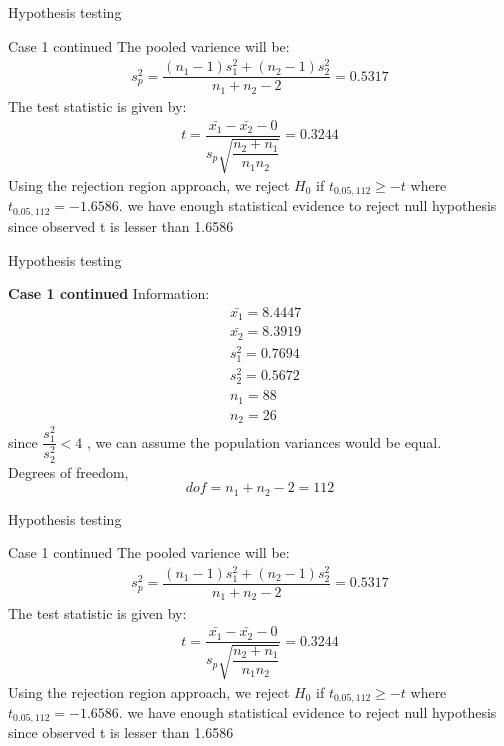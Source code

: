 \documentclass{beamer}
\begin{document}
    \begin{frame}{Hypothesis testing}
    \begin{block}{Case 1 continued}
        The pooled varience will be:
           \begin{align}
               s^2_p=\dfrac{(n_1-1)s^2_1+(n_2-1)s^2_2}{n_1+n_2-2}=0.5317
           \end{align}
           The test statistic is given by:
           \begin{align}
               t=\dfrac{\bar{x_1}-\bar{x_2}-0}{s_p\sqrt{\dfrac{n_2+n_1}{n_1n_2}}}=0.3244
           \end{align}
           Using the rejection region approach, we reject $H_0$ if $t_{0.05,112}\geq -t$ where $t_{0.05,112}=-1.6586$. we have enough statistical evidence to reject null hypothesis since observed t is lesser than 1.6586
           
    \end{block}
        
    \end{frame}

        \begin{frame}{Hypothesis testing}
        \begin{block}{\textbf{Case 1 continued}}
            Information:
             \begin{align}
                 &\bar{x_1}=8.4447\\
                 &\bar{x_2}=8.3919\\
                 &s^2_1=0.7694\\
                 &s^2_2=0.5672\\
                 &n_1=88\\
                 &n_2=26
             \end{align}
       since $\dfrac{s^2_1}{s^2_2}<4$ , we can assume the population variances would be equal. \\
       Degrees of freedom, $$dof=n_1+n_2-2=112$$
        \end{block}
    \end{frame}
    \begin{frame}{Hypothesis testing}
    \begin{block}{Case 1 continued}
        The pooled varience will be:
           \begin{align}
               s^2_p=\dfrac{(n_1-1)s^2_1+(n_2-1)s^2_2}{n_1+n_2-2}=0.5317
           \end{align}
           The test statistic is given by:
           \begin{align}
               t=\dfrac{\bar{x_1}-\bar{x_2}-0}{s_p\sqrt{\dfrac{n_2+n_1}{n_1n_2}}}=0.3244
           \end{align}
           Using the rejection region approach, we reject $H_0$ if $t_{0.05,112}\geq -t$ where $t_{0.05,112}=-1.6586$. we have enough statistical evidence to reject null hypothesis since observed t is lesser than 1.6586
           
    \end{block}
        
    \end{frame}
\end{document}

